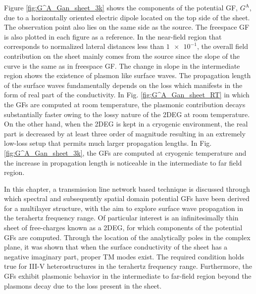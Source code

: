 Figure \ref{fig:G^A_Gan_sheet_3k} shows the components of the potential GF, $G^{\mathrm A}$, due to a horizontally oriented electric dipole located on the top side of the sheet. The observation point also lies on the same side as the source. The freespace GF is also plotted in each figure as a reference. In the near-field region that corresponds to normalized lateral distances less than $\num{1e-1}$, the overall field contribution on the sheet mainly comes from the source since the slope of the curve is the same as in freespace GF. The change in slope in the intermediate region shows the existence of plasmon like surface waves. The propagation length of the surface waves fundamentally depends on the loss which manifests in the form of real part of the conductivity. In Fig. \ref{fig:G^A_Gan_sheet_RT} in which the GFs are computed at room temperature, the plasmonic contribution decays substantially faster owing to the lossy nature of the 2DEG at room temperature. On the other hand, when the 2DEG is kept in a cryogenic environment, the real part is decreased by at least three order of magnitude resulting in an extremely low-loss setup that permits much larger propagation lengths. In Fig. \ref{fig:G^A_Gan_sheet_3k}, the GFs are computed at cryogenic temperature and the increase in propagation length is noticeable in the intermediate to far field region.



In this chapter, a transmission line network based technique is discussed through which spectral and subsequently spatial domain potential GFs have been derived for a multilayer structure, with the aim to explore surface wave propagation in the terahertz frequency range. Of particular interest is an infinitesimally thin sheet of free-charges known as a 2DEG, for which components of the potential GFs are computed. Through the location of the analytically poles in the complex plane, it was shown that when the surface conductivity of the sheet has a negative imaginary part, proper TM modes exist. The required condition holds true for III-V heterostructures in the terahertz frequency range. Furthermore, the GFs exhibit plasmonic behavior in the intermediate to far-field region beyond the plasmons decay due to the loss present in the sheet.

